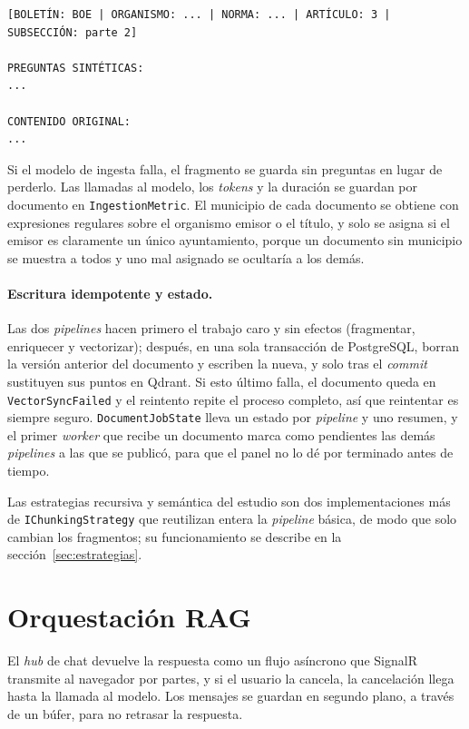 \begin{lstlisting}[caption={Texto enriquecido de un fragmento hijo (formato)},label={lst:fragmento-enriquecido}]
[BOLETÍN: BOE | ORGANISMO: ... | NORMA: ... | ARTÍCULO: 3 | SUBSECCIÓN: parte 2]

PREGUNTAS SINTÉTICAS:
...

CONTENIDO ORIGINAL:
...
\end{lstlisting}

Si el modelo de ingesta falla, el fragmento se guarda sin preguntas en lugar de perderlo. Las llamadas al modelo, los \emph{tokens} y la duración se guardan por documento en \texttt{IngestionMetric}. El municipio de cada documento se obtiene con expresiones regulares sobre el organismo emisor o el título, y solo se asigna si el emisor es claramente un único ayuntamiento, porque un documento sin municipio se muestra a todos y uno mal asignado se ocultaría a los demás.

\paragraph{Escritura idempotente y estado.} Las dos \emph{pipelines} hacen primero el trabajo caro y sin efectos (fragmentar, enriquecer y vectorizar); después, en una sola transacción de PostgreSQL, borran la versión anterior del documento y escriben la nueva, y solo tras el \emph{commit} sustituyen sus puntos en Qdrant. Si esto último falla, el documento queda en \texttt{VectorSyncFailed} y el reintento repite el proceso completo, así que reintentar es siempre seguro. \texttt{DocumentJobState} lleva un estado por \emph{pipeline} y uno resumen, y el primer \emph{worker} que recibe un documento marca como pendientes las demás \emph{pipelines} a las que se publicó, para que el panel no lo dé por terminado antes de tiempo.

Las estrategias recursiva y semántica del estudio son dos implementaciones más de \texttt{IChunkingStrategy} que reutilizan entera la \emph{pipeline} básica, de modo que solo cambian los fragmentos; su funcionamiento se describe en la sección~\ref{sec:estrategias}.

\section{Orquestación RAG}
\label{sec:impl-rag}

El \emph{hub} de chat devuelve la respuesta como un flujo asíncrono que SignalR \cite{signalr} transmite al navegador por partes, y si el usuario la cancela, la cancelación llega hasta la llamada al modelo. Los mensajes se guardan en segundo plano, a través de un búfer, para no retrasar la respuesta.

